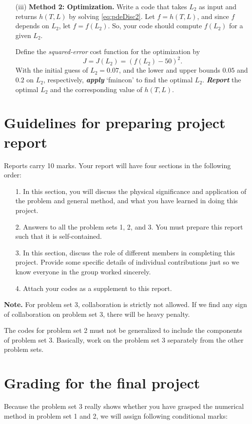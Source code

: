 \documentclass[11pt,a4paper]{article}
\newcommand{\bfit}[1]{\textit{\textbf{#1}}}
\begin{document}
\begin{itemize}
\item[(iii)] {\bf Method 2: Optimization.} Write a code that takes $L_2$ as input and returns $h(T, L)$ by solving \eqref{eq:pdeDisc2}. Let $f = h(T, L)$, and since $f$ depends on $L_2$, let $f = f(L_2)$. So, your code should compute $f(L_2)$ for a given $L_2$. 

Define the {\it squared-error} cost function for the optimization by
\begin{equation}
J = J(L_2) = (f(L_2) - 50)^2.
\end{equation}
With the initial guess of $L_2 = 0.07$, and the lower and upper bounds $0.05$ and $0.2$ on $L_2$, respectively, \bfit{apply} `fmincon' to find the optimal $L_2$. \bfit{Report} the optimal $L_2$ and the corresponding value of $h(T, L)$. 

\end{itemize}


\section{Guidelines for preparing project report} 
Reports carry 10 marks. Your report will have four sections in the following order:
\begin{itemize}
\item[1.] In this section, you will discuss the physical significance and application of the problem and general method, and what you have learned in doing this project.
\item[2.] Answers to all the problem sets 1, 2, and 3. You must prepare this report such that it is self-contained. 
\item[3.] In this section, discuss the role of different members in completing this project. Provide some specific details of individual contributions just so we know everyone in the group worked sincerely. 
\item[4.] Attach your codes as a supplement to this report.
\end{itemize}

{\color{red} {\bf Note.} For problem set 3, collaboration is strictly not allowed. If we find any sign of collaboration on problem set 3, there will be heavy penalty.

The codes for problem set 2 must not be generalized to include the components of problem set 3. Basically, work on the problem set 3 separately from the other problem sets. }


\section{Grading for the final project}
Because the problem set 3 really shows whether you have grasped the numerical method in problem set 1 and 2, we will assign following conditional marks:
\end{document}
